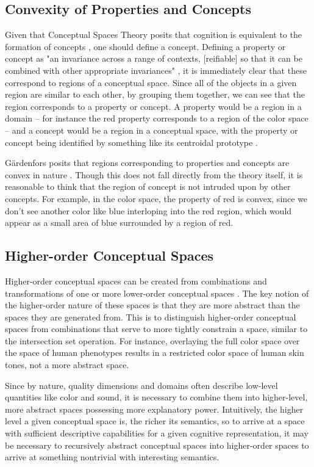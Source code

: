 \subsection{Convexity of Properties and Concepts}
\label{section:convexity-properties-concepts}

Given that Conceptual Spaces Theory posits that cognition is equivalent to the formation of concepts \citep{gardenfors2004conceptual}, one should define a concept.  Defining a property or concept as "an invariance across a range of contexts, [reifiable] so that it can be combined with other appropriate invariances" \citep{kirsh1991today}, it is immediately clear that these correspond to regions of a conceptual space.  Since all of the objects in a given region are similar to each other, by grouping them together, we can see that the region corresponds to a property or concept. A property would be a region in a domain -- for instance the red property corresponds to a region of the color space -- and a concept would be a region in a conceptual space, with the property or concept being identified by something like its centroidal prototype \citep{rosch1983prototype}.

G{\"a}rdenfors posits that regions corresponding to properties and concepts are convex in nature \citep{gardenfors2004conceptual}.  Though this does not fall directly from the theory itself, it is reasonable to think that the region of concept is not intruded upon by other concepts.  For example, in the color space, the property of red is convex, since we don't see another color like blue interloping into the red region, which would appear as a small area of blue surrounded by a region of red.

\subsection{Higher-order Conceptual Spaces}
\label{section:higher-order-conceptual-spaces}

Higher-order conceptual spaces can be created from combinations and transformations of one or more lower-order conceptual spaces \citep{chella2008cognitive}.  The key notion of the higher-order nature of these spaces is that they are more abstract than the spaces they are generated from.  This is to distinguish higher-order conceptual spaces from combinations that serve to more tightly constrain a space, similar to the intersection set operation.  For instance, overlaying the full color space over the space of human phenotypes results in a restricted color space of human skin tones, not a more abstract space.

Since by nature, quality dimensions and domains often describe low-level quantities like color and sound, it is necessary to combine them into higher-level, more abstract spaces possessing more explanatory power.  Intuitively, the higher level a given conceptual space is, the richer its semantics, so to arrive at a space with sufficient descriptive capabilities for a given cognitive representation, it may be necessary to recursively abstract conceptual spaces into higher-order spaces to arrive at something nontrivial with interesting semantics.
